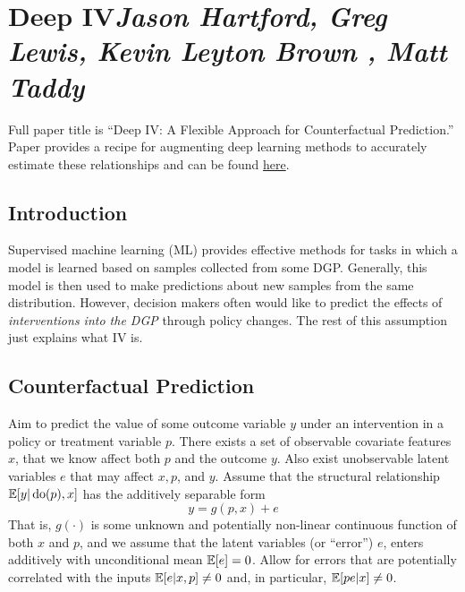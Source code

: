 
\section{Deep IV\textit{\small Jason Hartford, Greg Lewis, Kevin Leyton Brown , Matt Taddy}}
 
 Full paper title is ``Deep IV: A Flexible Approach for Counterfactual Prediction.'' Paper provides a recipe for augmenting deep learning methods to accurately estimate these relationships and can be found \href{http://proceedings.mlr.press/v70/hartford17a/hartford17a.pdf}{here}.

 \subsection{Introduction}

 Supervised machine learning (ML) provides effective methods for tasks in which a model is learned based on samples collected from some DGP. Generally, this model is then used to make predictions about new samples from the same distribution. However, decision makers often would like to predict the effects of \emph{interventions into the DGP} through policy changes. The rest of this assumption just explains what IV is.

 \subsection{Counterfactual Prediction}

 Aim to predict the value of some outcome variable $y$ under an intervention in a policy or treatment variable $p$. There exists a set of observable covariate features $x$, that we know affect both $p$ and the outcome $y$. Also exist unobservable latent variables $e$ that may affect $x,p$, and $y$. Assume that the structural relationship $\mathbb{E}[y |\operatorname{do}(p),x]$ has the additively separable form 
 \begin{equation}
 	\label{eq:deepIV-1}
 	y = g(p, x) + e
 \end{equation}
That is, $g(\cdot)$ is some unknown and potentially non-linear continuous function of both $x$ and $p$, and we assume that the latent variables (or ``error'') $e$, enters additively with unconditional mean $\mathbb{E}[e] = 0$. Allow for errors that are potentially correlated with the inputs $\mathbb{E}[e|x,p] \neq 0$ and, in particular, $\mathbb{E}[pe|x]\neq 0$. 

